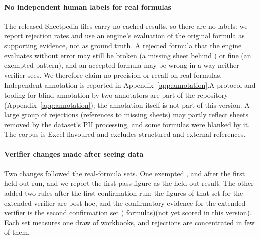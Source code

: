 \paragraph{No independent human labels for real formulas}
The released Sheetpedia files carry no cached results, so there are no labels: we report rejection rates and use an engine's evaluation of the original formula as supporting evidence, not as ground truth. A rejected formula that the engine evaluates without error may still be broken (a missing sheet behind ) or fine (an exempted pattern), and an accepted formula may be wrong in a way neither verifier sees. We therefore claim no precision or recall on real formulas. \ifdefined\annN Independent annotation is reported in Appendix~\ref{app:annotation}.\else A protocol and tooling for blind annotation by two annotators are part of the repository (Appendix~\ref{app:annotation}); the annotation itself is not part of this version.\fi{} A large group of rejections (references to missing sheets) may partly reflect sheets removed by the dataset's PII processing, and some formulas were blanked by it. The corpus is Excel-flavoured and excludes structured and external references.

\paragraph{Verifier changes made after seeing data}
Two changes followed the real-formula sets. One exempted ,  and  after the first held-out run, and we report the first-pass figure as the held-out result. The other added two rules after the first confirmation run; the figures of that set for the extended verifier are post hoc, and the confirmatory evidence for the extended verifier is the second confirmation set \ifdefined\rwcGFormulas (\rwcGFormulas{} formulas)\else (not yet scored in this version)\fi. Each set measures one draw of workbooks, and rejections are concentrated in few of them.

